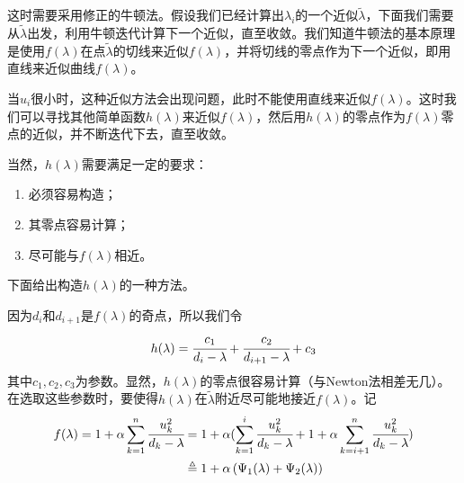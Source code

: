 \documentclass[12pt,a4paper]{article}
\begin{document}
这时需要采用修正的牛顿法。假设我们已经计算出$\lambda _i$的一个近似$\tilde{\lambda}$，下面我们需要从$\tilde{\lambda}$出发，利用牛顿迭代计算下一个近似，直至收敛。我们知道牛顿法的基本原理是使用$f(\lambda)$在点$\tilde{\lambda}$的切线来近似$f(\lambda)$，并将切线的零点作为下一个近似，即用直线来近似曲线$f(\lambda)$。

当$u_i$很小时，这种近似方法会出现问题，此时不能使用直线来近似$f(\lambda)$。这时我们可以寻找其他简单函数$h(\lambda)$来近似$f(\lambda)$，然后用$h(\lambda)$的零点作为$f(\lambda)$零点的近似，并不断迭代下去，直至收敛。

当然，$h(\lambda)$需要满足一定的要求：
\begin{enumerate}[（1）]
	\item 必须容易构造；
	\item 其零点容易计算；
	\item 尽可能与$f(\lambda)$相近。
\end{enumerate}

下面给出构造$h(\lambda)$的一种方法。

因为$d_i$和$d_{i+1}$是$f(\lambda)$的奇点，所以我们令$$h(\lambda)=\cfrac{c_1}{d_i-\lambda}+\cfrac{c_2}{d_{i+1}-\lambda}+c_3$$
其中$c_1,c_2,c_3$为参数。显然，$h(\lambda)$的零点很容易计算（与Newton法相差无几）。在选取这些参数时，要使得$h(\lambda)$在$\tilde{\lambda}$附近尽可能地接近$f(\lambda)$。记$$\begin{aligned}
f(\lambda)=1+\alpha \sum_{k=1}^n \cfrac{u_k^2}{d_k-\lambda}&=1+\alpha (\sum_{k=1}^i \cfrac{u_k^2}{d_k-\lambda}+1+\alpha \sum_{k=i+1}^n \cfrac{u_k^2}{d_k-\lambda})\\&\triangleq 1+\alpha\left(\Psi_{1}(\lambda)+\Psi_{2}(\lambda)\right)
\end{aligned}$$
\end{document}
